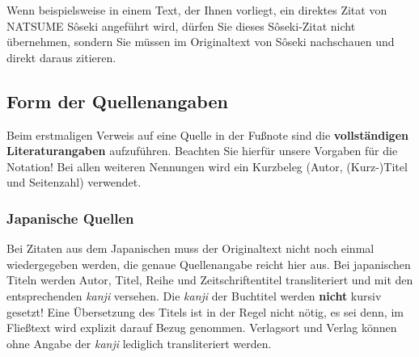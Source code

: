 \documentclass{japo}
\begin{document}
Wenn beispielsweise in einem Text, der Ihnen vorliegt, ein direktes Zitat von NATSUME Sôseki angeführt wird, dürfen Sie dieses Sôseki-Zitat nicht übernehmen, sondern Sie müssen im Originaltext von Sôseki nachschauen und direkt daraus zitieren.

\subsection{Form der Quellenangaben}
Beim erstmaligen Verweis auf eine Quelle in der Fußnote sind die \textbf{vollständigen Literaturangaben} aufzuführen. Beachten Sie hierfür unsere Vorgaben für die Notation! Bei allen weiteren Nennungen wird ein Kurzbeleg (Autor, (Kurz-)Titel und Seitenzahl) verwendet.%

\subsubsection{Japanische Quellen}
Bei Zitaten aus dem Japanischen muss der Originaltext nicht noch einmal wiedergegeben werden, die genaue Quellenangabe reicht hier aus. Bei japanischen Titeln werden Autor, Titel, Reihe und Zeitschriftentitel transliteriert und mit den entsprechenden \textit{kanji} versehen. Die \textit{kanji} der Buchtitel werden \textbf{nicht} kursiv gesetzt! Eine Übersetzung des Titels ist in der Regel nicht nötig, es sei denn, im Fließtext wird explizit darauf Bezug genommen. Verlagsort und Verlag können ohne Angabe der \textit{kanji} lediglich transliteriert werden.%

\end{document}
